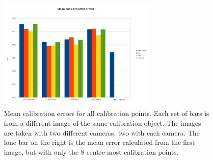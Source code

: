 \begin{figure}[ht]
  \centering
  \includegraphics[width=0.7\textwidth]{figures/calibration-means}
  \caption[Mean calibration errors]{Mean calibration errors for all
    calibration points. Each set of bars is from a different image of
    the same calibration object. The images are taken with two
    different cameras, two with each camera. The lone bar on the right
    is the mean error calculated from the first image, but with only
    the 8 centre-most calibration points.}
  \label{fig:calib-errors}
\end{figure}


%
%
%
%
%
